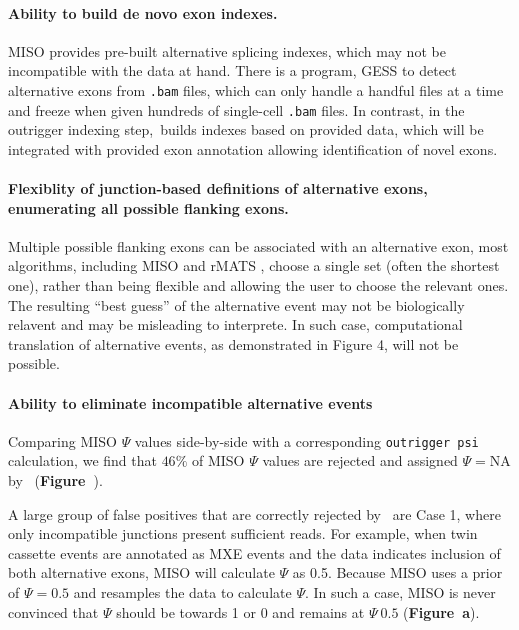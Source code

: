 \paragraph{Ability to build de novo exon indexes.} MISO provides pre-built alternative splicing indexes, which may not be incompatible with the data at hand. There is a program, GESS \cite{Ye:2014cd} to detect alternative exons from \texttt{.bam} files, which can only handle a handful files at a time and freeze when given hundreds of single-cell \texttt{.bam} files. In contrast, in the outrigger indexing step, \outrigger\,builds indexes based on provided data, which will be integrated with provided exon annotation allowing identification of novel exons.

\paragraph{Flexiblity of junction-based definitions of alternative exons, enumerating all possible flanking exons.} Multiple possible flanking exons can be associated with an alternative exon, most algorithms, including MISO and rMATS \cite{Shen2014-zq}, choose a single set (often the shortest one), rather than being flexible and allowing the user to choose the relevant ones. The resulting ``best guess'' of the alternative event may not be biologically relavent and may be misleading to interprete. In such case, computational translation of alternative events, as demonstrated in Figure 4, will not be possible.

\paragraph{Ability to eliminate incompatible alternative events} Comparing MISO $\Psi$ values side-by-side with a corresponding \texttt{outrigger psi} calculation, we find that $46\%$ of MISO $\Psi$ values are rejected and assigned $\Psi = \text{NA}$ by \outrigger\, (\textbf{Figure~}).

A large group of false positives that are correctly rejected by \outrigger\, are Case 1, where only incompatible junctions present sufficient reads. For example, when twin cassette events are annotated as MXE events and the data indicates inclusion of both alternative exons, MISO will calculate $\Psi$ as 0.5. Because MISO uses a prior of $\Psi=0.5$ and resamples the data to calculate $\Psi$. In such a case, MISO is never convinced that $\Psi$ should be towards 1 or 0 and remains at $\Psi~0.5$ (\textbf{Figure~a}). %

